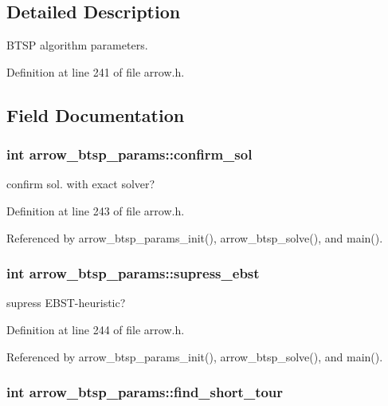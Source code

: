 \subsection{Detailed Description}
BTSP algorithm parameters. 

Definition at line 241 of file arrow.h.

\subsection{Field Documentation}
\hypertarget{structarrow__btsp__params_2c579feb3ff41f4d73b5de97596fe465}{
\subsubsection{\setlength{\rightskip}{0pt plus 5cm}int {\bf arrow\_\-btsp\_\-params::confirm\_\-sol}}}
\label{structarrow__btsp__params_2c579feb3ff41f4d73b5de97596fe465}


confirm sol. with exact solver? 

Definition at line 243 of file arrow.h.

Referenced by arrow\_\-btsp\_\-params\_\-init(), arrow\_\-btsp\_\-solve(), and main().\hypertarget{structarrow__btsp__params_cd85b850ac7c8495a4689100e8c3182c}{
\subsubsection{\setlength{\rightskip}{0pt plus 5cm}int {\bf arrow\_\-btsp\_\-params::supress\_\-ebst}}}
\label{structarrow__btsp__params_cd85b850ac7c8495a4689100e8c3182c}


supress EBST-heuristic? 

Definition at line 244 of file arrow.h.

Referenced by arrow\_\-btsp\_\-params\_\-init(), arrow\_\-btsp\_\-solve(), and main().\hypertarget{structarrow__btsp__params_f5fd677200b64930838c6905cbada990}{
\subsubsection{\setlength{\rightskip}{0pt plus 5cm}int {\bf arrow\_\-btsp\_\-params::find\_\-short\_\-tour}}}
\label{structarrow__btsp__params_f5fd677200b64930838c6905cbada990}



